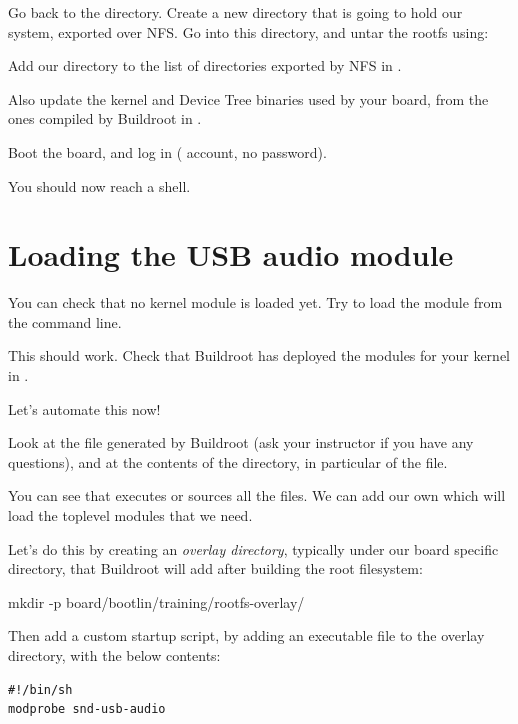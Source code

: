 Go back to the  directory. Create
a new  directory that is going to hold our system,
exported over NFS. Go into this directory, and untar the rootfs using:


Add our  directory to the list of directories exported
by NFS in .

Also update the kernel and Device Tree binaries used by your board,
from the ones compiled by Buildroot in .

Boot the board, and log in ( account, no password).

You should now reach a shell.

\section{Loading the USB audio module}

You can check that no kernel module is loaded yet. Try to load the
 module from the command line.

This should work. Check that Buildroot has deployed the modules
for your kernel in .

Let's automate this now!

Look at the  file generated by Buildroot (ask your
instructor if you have any questions), and at the contents of the
 directory, in particular of the  file.

You can see that  executes or sources all the 
files. We can add our own which will load the toplevel modules that we
need.

Let's do this by creating an {\em overlay directory}, typically under
our board specific directory, that Buildroot will add after building the
root filesystem:

\begin{bashinput}
mkdir -p board/bootlin/training/rootfs-overlay/
\end{bashinput}

Then add a custom startup script, by adding an 
executable file to the overlay directory, with the below contents:

\begin{verbatim}
#!/bin/sh
modprobe snd-usb-audio
\end{verbatim}


